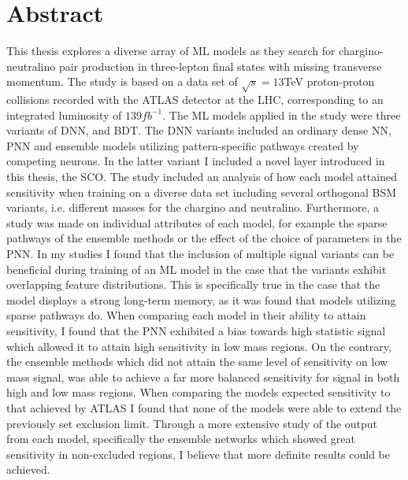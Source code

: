 \chapter*{Abstract} 
This thesis explores a diverse array of \acf{ML} models as they search for chargino-neutralino pair production in 
three-lepton final states with missing transverse momentum. The study is based on a data set of $\sqrt{s} = 13$TeV proton-proton
collisions recorded with the \acs{ATLAS} detector at the \acs{LHC}, corresponding to an integrated luminosity of $139 fb^{-1}$. The \acs{ML} 
models applied in the study were three variants of \acf{DNN}, and \acf{BDT}. The \acs{DNN} variants included an ordinary 
dense \acf{NN}, \acf{PNN} and ensemble models utilizing pattern-specific pathways created by competing neurons. In the latter variant I 
included a novel layer introduced in this thesis, the \acf{SCO}. The study included an analysis of how each model attained sensitivity 
when training on a diverse data set including several orthogonal \acf{BSM} variants, i.e. different masses for the chargino and neutralino. 
Furthermore, a study was made on individual attributes of each model, for example the sparse pathways of the ensemble methods or the effect 
of the choice of parameters in the \acs{PNN}. In my studies I found that the inclusion of multiple signal variants can be beneficial during 
training of an \ac{ML} model in the case that the variants exhibit overlapping feature distributions. This is specifically true in 
the case that the model displays a strong long-term memory, as it was found that models utilizing sparse pathways do. When comparing each 
model in their ability to attain sensitivity, I found that the \acs{PNN} exhibited a bias towards high statistic signal which allowed it 
to attain high sensitivity in low mass regions. On the contrary, the ensemble methods which did not attain the same level of sensitivity 
on low mass signal, was able to achieve a far more balanced sensitivity for signal in both high and low mass regions. When comparing the 
models expected sensitivity to that achieved by \acs{ATLAS} I found that none of the models were able to extend the previously set exclusion limit.
Through a more extensive study of the output from each model, specifically the ensemble networks which showed great sensitivity in non-excluded 
regions, I believe that more definite results could be achieved. 
